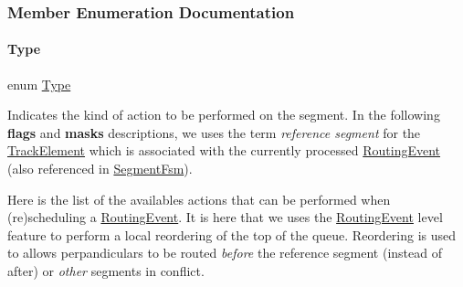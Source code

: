 \subsubsection{Member Enumeration Documentation}
\mbox{\label{classKite_1_1SegmentAction_a1d1cfd8ffb84e947f82999c682b666a7}} 
\paragraph{\texorpdfstring{Type}{Type}}
{\footnotesize\ttfamily enum \mbox{\hyperlink{classKite_1_1SegmentAction_a1d1cfd8ffb84e947f82999c682b666a7}{Type}}}

Indicates the kind of action to be performed on the segment. In the following {\bfseries flags} and {\bfseries masks} descriptions, we uses the term {\itshape reference segment} for the \mbox{\hyperlink{classKite_1_1TrackElement}{Track\+Element}} which is associated with the currently processed \mbox{\hyperlink{classKite_1_1RoutingEvent}{Routing\+Event}} (also referenced in \mbox{\hyperlink{classKite_1_1SegmentFsm}{Segment\+Fsm}}).

Here is the list of the availables actions that can be performed when (re)scheduling a \mbox{\hyperlink{classKite_1_1RoutingEvent}{Routing\+Event}}. It is here that we uses the \mbox{\hyperlink{classKite_1_1RoutingEvent}{Routing\+Event}} level feature to perform a local reordering of the top of the queue. Reordering is used to allows perpandiculars to be routed {\itshape before} the reference segment (instead of after) or {\itshape other} segments in conflict.


